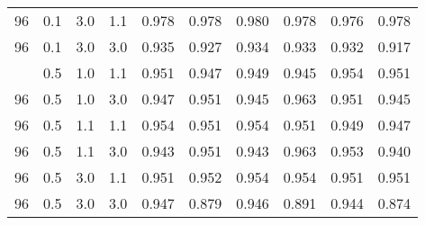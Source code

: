 \begin{longtable}[t]{ccccrrrrrr}
96 & 0.1 & 3.0 & 1.1 & 0.978 & 0.978 & 0.980 & 0.978 & 0.976 & 0.978\\
96 & 0.1 & 3.0 & 3.0 & 0.935 & 0.927 & 0.934 & 0.933 & 0.932 & 0.917\\
\addlinespace
96 & 0.5 & 1.0 & 1.1 & 0.951 & 0.947 & 0.949 & 0.945 & 0.954 & 0.951\\
96 & 0.5 & 1.0 & 3.0 & 0.947 & 0.951 & 0.945 & 0.963 & 0.951 & 0.945\\
96 & 0.5 & 1.1 & 1.1 & 0.954 & 0.951 & 0.954 & 0.951 & 0.949 & 0.947\\
96 & 0.5 & 1.1 & 3.0 & 0.943 & 0.951 & 0.943 & 0.963 & 0.953 & 0.940\\
96 & 0.5 & 3.0 & 1.1 & 0.951 & 0.952 & 0.954 & 0.954 & 0.951 & 0.951\\
96 & 0.5 & 3.0 & 3.0 & 0.947 & 0.879 & 0.946 & 0.891 & 0.944 & 0.874\\
\bottomrule
\end{longtable}
\endgroup{}
